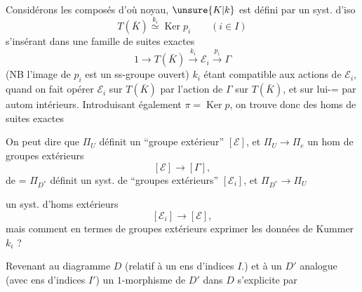 
Considérons les composés
d'où noyau,  $\unsure{K|k}$ est défini par un syst. d'iso
\[
T(\bar K)\overset{k_i}{\simeq}\operatorname{Ker}p_i\qquad(i\in I)
\]
s'insérant dans une famille de suites exactes
\[
1\longrightarrow T(\bar K)\xrightarrow{k_i}\mathcal E_i\xrightarrow{p_i}\Gamma
\]
(NB l'image de $p_i$ est un ss-groupe ouvert)
$k_i$ étant compatible aux actions de $\mathcal E_i$, quand on fait opérer $\mathcal E_i$ sur $T(\bar K)$ par l'action de $\Gamma$ sur $T(\bar K)$, et sur lui-= par autom intérieurs. Introduisant également $\pi=\operatorname{Ker}p$, on trouve donc des homs de suites exactes

On peut dire que $\Pi_U$ définit un ``groupe extérieur'' $[\mathcal E]$, et $\Pi_U\longrightarrow\Pi_e$ un hom de groupes extérieurs
\[
[\mathcal E]\longrightarrow[\Gamma],
\]
de = $\Pi_{D^*}$ définit un syst. de ``groupes extérieurs'' $[\mathcal E_i]$, et  $\Pi_{D^*}\longrightarrow\Pi_U$


un syst. d'homs extérieurs
\[
[\mathcal E_i]\longrightarrow[\mathcal E],
\]
 mais comment en termes de groupes extérieurs exprimer les données de Kummer $k_i$ ?

Revenant au  diagramme $D$ (relatif à un ens d'indices $I$.) et à un $D'$ analogue (avec ens d'indices $I'$)
un $1$-morphisme  de $D'$ dans $D$ s'explicite par

